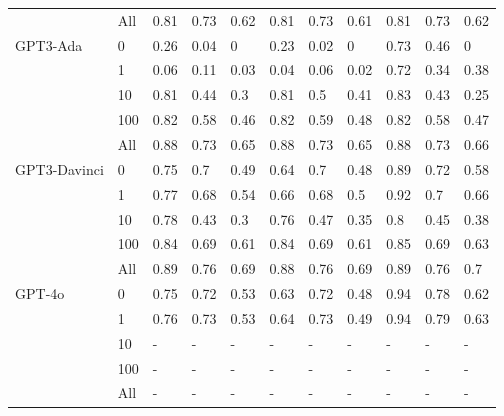 \begin{table}
\begin{tabular}[t]{llll>{}l|ll>{}l|lll}
 & All & 0.81 & 0.73 & 0.62 & 0.81 & 0.73 & 0.61 & 0.81 & 0.73 & 0.62\\
\cmidrule{1-11}
GPT3-Ada & 0 & 0.26 & 0.04 & 0 & 0.23 & 0.02 & 0 & 0.73 & 0.46 & 0\\

 & 1 & 0.06 & 0.11 & 0.03 & 0.04 & 0.06 & 0.02 & 0.72 & 0.34 & 0.38\\

 & 10 & 0.81 & 0.44 & 0.3 & 0.81 & 0.5 & 0.41 & 0.83 & 0.43 & 0.25\\

 & 100 & 0.82 & 0.58 & 0.46 & 0.82 & 0.59 & 0.48 & 0.82 & 0.58 & 0.47\\

 & All & 0.88 & 0.73 & 0.65 & 0.88 & 0.73 & 0.65 & 0.88 & 0.73 & 0.66\\
\cmidrule{1-11}
GPT3-Davinci & 0 & 0.75 & 0.7 & 0.49 & 0.64 & 0.7 & 0.48 & 0.89 & 0.72 & 0.58\\

 & 1 & 0.77 & 0.68 & 0.54 & 0.66 & 0.68 & 0.5 & 0.92 & 0.7 & 0.66\\

 & 10 & 0.78 & 0.43 & 0.3 & 0.76 & 0.47 & 0.35 & 0.8 & 0.45 & 0.38\\

 & 100 & 0.84 & 0.69 & 0.61 & 0.84 & 0.69 & 0.61 & 0.85 & 0.69 & 0.63\\

 & All & 0.89 & 0.76 & 0.69 & 0.88 & 0.76 & 0.69 & 0.89 & 0.76 & 0.7\\
\cmidrule{1-11}
GPT-4o & 0 & 0.75 & 0.72 & 0.53 & 0.63 & 0.72 & 0.48 & 0.94 & 0.78 & 0.62\\

 & 1 & 0.76 & 0.73 & 0.53 & 0.64 & 0.73 & 0.49 & 0.94 & 0.79 & 0.63\\

 & 10 & - & - & - & - & - & - & - & - & -\\

 & 100 & - & - & - & - & - & - & - & - & -\\

 & All & - & - & - & - & - & - & - & - & -\\
\bottomrule
\end{tabular}
\endgroup{}
\end{table}